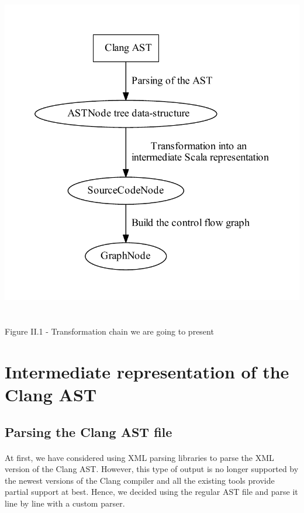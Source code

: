 \documentclass{report}
\begin{document}
\begin{center}
\includegraphics[scale=0.5]{data/transform_chain}
~\\~\\Figure II.1 - Transformation chain we are going to present
\end{center}

\section{Intermediate representation of the Clang AST}

\subsection{Parsing the Clang AST file}

\paragraph{}
\hspace{4mm}At first, we have considered using XML parsing libraries to parse the XML version of the Clang AST. However, 
this type of output is no longer supported by the newest versions of the Clang compiler and all the existing tools
provide partial support at best. Hence, we decided using the regular AST file and parse it line by line 
with a custom parser.
\end{document}
